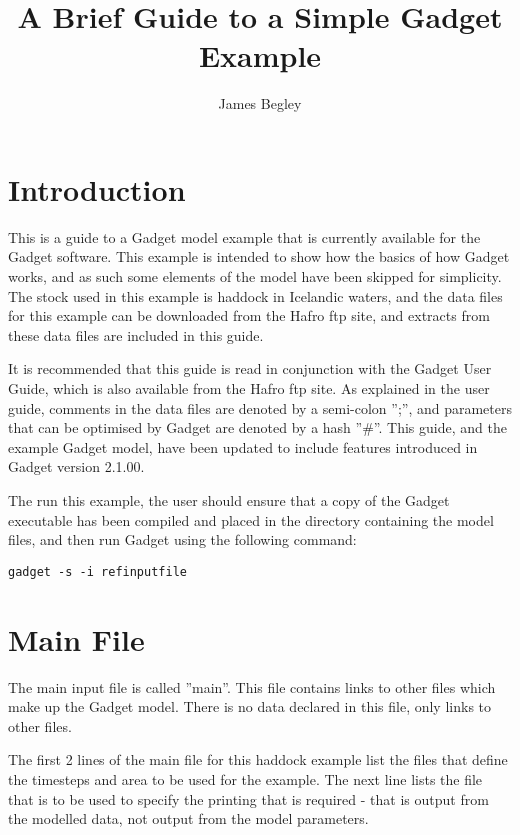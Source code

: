 \documentclass[10pt,twoside]{article}
\begin{document}
\title{\Huge{A Brief Guide to a Simple Gadget Example}}
\author{James Begley}
\date{}
\maketitle

\section{Introduction}
This is a guide to a Gadget model example that is currently available for the Gadget software.  This example is intended to show how the basics of how Gadget works, and as such some elements of the model have been skipped for simplicity.  The stock used in this example is haddock in Icelandic waters, and the data files for this example can be downloaded from the Hafro ftp site, and extracts from these data files are included in this guide.

\bigskip
It is recommended that this guide is read in conjunction with the Gadget User Guide, which is also available from the Hafro ftp site.  As explained in the user guide, comments in the data files are denoted by a semi-colon '';'', and parameters that can be optimised by Gadget are denoted by a hash ''\#''.  This guide, and the example Gadget model, have been updated to include features introduced in Gadget version 2.1.00. 

\bigskip
The run this example, the user should ensure that a copy of the Gadget executable has been compiled and placed in the directory containing the model files, and then run Gadget using the following command:

{\small\begin{verbatim}
gadget -s -i refinputfile
\end{verbatim}}

\section{Main File}
The main input file is called ''main''.  This file contains links to other files which make up the Gadget model.  There is no data declared in this file, only links to other files.

{\small }

The first 2 lines of the main file for this haddock example list the files that define the timesteps and area to be used for the example.  The next line lists the file that is to be used to specify the printing that is required - that is output from the modelled data, not output from the model parameters.
\end{document}

